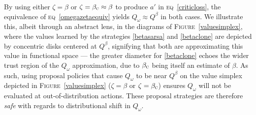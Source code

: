 By using either $\zeta = \beta$ or $\zeta = \beta_\textsc{c} \approx \beta$
to produce $a'$ in \textsc{eq}~\ref{criticloss},
the equivalence of \textsc{eq}~\ref{omegazetaequiv} yields
$Q_\omega \approx Q^\beta$ in both cases.
We illustrate this, albeit through an abstract lens, in the diagrams of \textsc{Figure}~\ref{valuesimplex},
where the values learned by the strategies \ref{betasarsa} and \ref{betaclone} are depicted by
concentric disks centered at $Q^\beta$, signifying that both are approximating this value in functional space
--- the greater diameter for \ref{betaclone} echoes the wider trust region of the $Q_\omega$ approximation,
due to $\beta_\textsc{c}$ being itself an estimate of $\beta$.
As such, using proposal policies that cause $Q_\omega$ to be near $Q^\beta$ on the value simplex
depicted in \textsc{Figure}~\ref{valuesimplex} ($\zeta = \beta$ or $\zeta = \beta_\textsc{c}$)
ensures $Q_\omega$ will not be evaluated at out-of-distribution actions.
These proposal strategies are therefore \textit{safe} with regards to distributional shift in $Q_\omega$.

